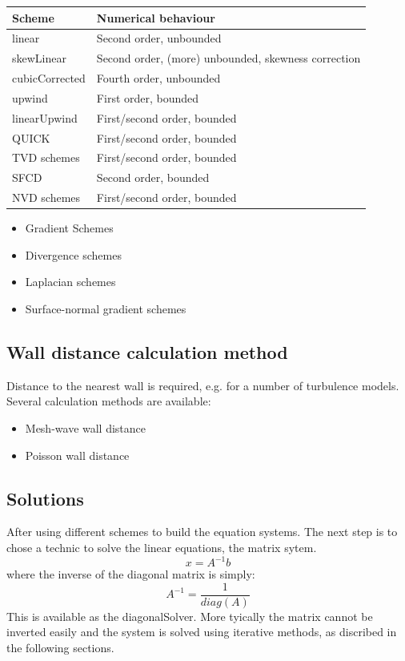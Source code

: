 \documentclass{article}
\begin{document}
\begin{tabular}{l | l }
\hline
Scheme  &	Numerical behaviour \\
\hline 
linear	&   Second order, unbounded  \\
skewLinear	&  	Second order, (more) unbounded, skewness correction   \\
cubicCorrected		&  Fourth order, unbounded   \\
upwind		&  First order, bounded   \\
linearUpwind		&   First/second order, bounded   \\
QUICK		&  First/second order, bounded   \\
TVD schemes	&  	First/second order, bounded   \\
SFCD	&  	Second order, bounded   \\
NVD schemes	&  	First/second order, bounded   \\
\hline
\end{tabular}

\begin{itemize}
\item Gradient Schemes
\item Divergence schemes
\item Laplacian schemes
\item Surface-normal gradient schemes
\end{itemize}

\subsection{Wall distance calculation method}

Distance to the nearest wall is required, e.g. for a number of turbulence models. Several calculation methods are available:
\begin{itemize}
\item Mesh-wave wall distance
\item Poisson wall distance 
\end{itemize}

\subsection{Solutions}

After using different schemes to build the equation systems. The next step is to chose a technic to solve the linear equations, the matrix sytem. 
\begin{equation}
x = A^{-1}b
\end{equation}
where the inverse of the diagonal matrix is simply:
\begin{equation}
A^{-1} = \frac{1}{diag(A)}
\end{equation}
This is available as the diagonalSolver. More tyically the matrix cannot be inverted easily and the system is solved using iterative methods, as discribed in the following sections. 
\end{document}
